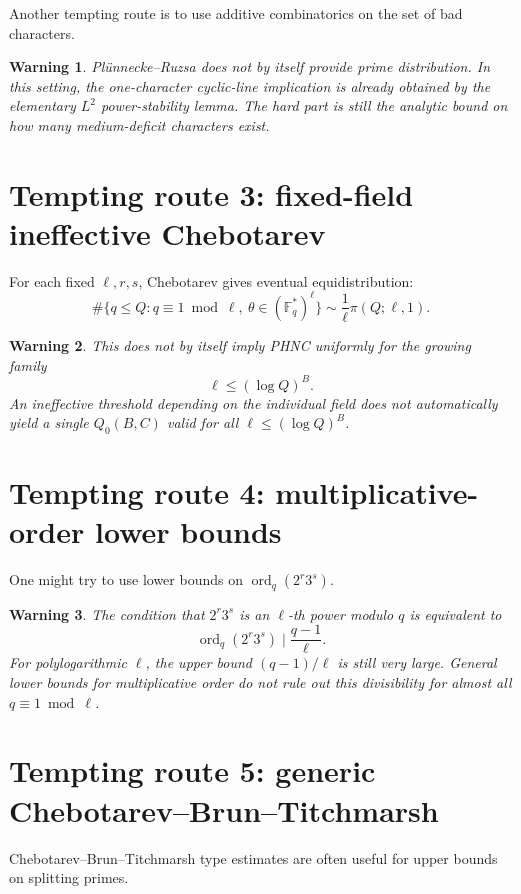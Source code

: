 \documentclass[11pt]{article}
\newtheorem{warning}{Warning}
\newcommand{\F}{\mathbb F}
\newcommand{\1}{\mathbf 1}
\newcommand{\ord}{\operatorname{ord}}
\begin{document}
Another tempting route is to use additive combinatorics on the set of bad characters.

\begin{warning}
Pl\"unnecke--Ruzsa does not by itself provide prime distribution.  In this setting, the one-character cyclic-line implication is already obtained by the elementary \(L^2\) power-stability lemma.  The hard part is still the analytic bound on how many medium-deficit characters exist.
\end{warning}

\section{Tempting route 3: fixed-field ineffective Chebotarev}

For each fixed \(\ell,r,s\), Chebotarev gives eventual equidistribution:
\[
\#\{q\le Q:q\equiv1\bmod\ell,\ \theta\in(\F_q^*)^\ell\}
\sim
\frac1\ell\pi(Q;\ell,1).
\]

\begin{warning}
This does not by itself imply PHNC uniformly for the growing family
\[
\ell\le(\log Q)^B.
\]
An ineffective threshold depending on the individual field does not automatically yield a single \(Q_0(B,C)\) valid for all \(\ell\le(\log Q)^B\).
\end{warning}

\section{Tempting route 4: multiplicative-order lower bounds}

One might try to use lower bounds on \(\ord_q(2^r3^s)\).

\begin{warning}
The condition that \(2^r3^s\) is an \(\ell\)-th power modulo \(q\) is equivalent to
\[
\ord_q(2^r3^s)\mid\frac{q-1}{\ell}.
\]
For polylogarithmic \(\ell\), the upper bound \((q-1)/\ell\) is still very large.  General lower bounds for multiplicative order do not rule out this divisibility for almost all \(q\equiv1\bmod\ell\).
\end{warning}

\section{Tempting route 5: generic Chebotarev--Brun--Titchmarsh}

Chebotarev--Brun--Titchmarsh type estimates are often useful for upper bounds on splitting primes.
\end{document}
